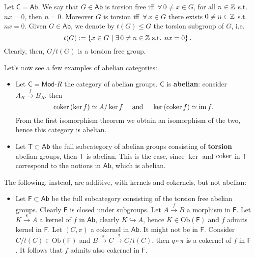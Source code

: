 \begin{ex}
	Let $\mathsf{C} = \mathsf{Ab}$. We say that $G \in \mathsf{Ab}$ is torsion free iff $\,\forall\,  0 \neq x \in G$, for all $n \in \mathbb{Z}$ s.t. $nx = 0$, then $n = 0$.
	Moreover $G$ is torsion iff $\,\forall\,  x \in G$ there exists $0 \neq n \in \mathbb{Z}$ s.t. $nx = 0$.
	Given $G \in \mathsf{Ab}$, we denote by $t(G) \leq G$ the torsion subgroup of $G$, i.e.
	\begin{equation}
		t(G) := \left\{ x \in G \ \middle|\ \exists\, 0 \neq n \in \Z \text{ s.t. } nx = 0 \right\}
	.\end{equation} 
	Clearly, then, $G/t(G)$ is a torsion free group.

	Let's now see a few examples of abelian categories:
	\begin{itemize}
		\item Let $\mathsf{C} = \mathsf{Mod}\text{-}R$ the category of abelian groups.
			$\mathsf{C}$ is \textbf{abelian}: consider $A_R \xrightarrow{f} B_R$, then
			\begin{equation}
				\operatorname{coker} \left( \ker f \right) \simeq A/ \ker f \quad \text{ and } \quad
				\ker \left( \operatorname{coker} f \right) \simeq \operatorname{im} f
			.\end{equation} 
			From the first isomorphism theorem we obtain an isomorphism of the two, hence this category is abelian.
		\item Let $\mathsf{T} \subset \mathsf{Ab}$  the full subcategory of abelian groups consisting of \textbf{torsion} abelian groups, then $\mathsf{T}$ is abelian.
			This is the case, since $\ker$ and $\operatorname{coker}$ in $\mathsf{T}$ correspond to the notions in $\mathsf{Ab}$, which is abelian.
	\end{itemize}
	The following, instead, are additive, with kernels and cokernels, but not abelian:
	\begin{itemize}
		\item Let $\mathsf{F} \subset \mathsf{Ab}$ be the full subcategory consisting of the torsion free abelian groups.
			Clearly $\mathsf{F}$ is closed under subgroups.
			Let $A \xrightarrow{f} B$ a morphism in $\mathsf{F}$.
			Let $K \xrightarrow{\epsilon} A$ a kernel of $f$ in $\mathsf{Ab}$, clearly $K \hookrightarrow A$, hence $K \in \mathrm{Ob} \left(\mathsf{F}\right)$ and $f$ admits kernel in $\mathsf{F}$.
			Let $\left(C, \pi\right)$ a cokernel in $\mathsf{Ab}$. It might not be in $\mathsf{F}$.
			Consider $C/t(C) \in \mathrm{Ob} \left(\mathsf{F}\right)$ and $B \xrightarrow{\pi} C \xrightarrow{q} C/t(C)$, then $q \circ \pi$ is a cokernel of $f$ in $\mathsf{F}$.
			It follows that $f$ admits also cokernel in $\mathsf{F}$.


\end{itemize}
\end{ex}
